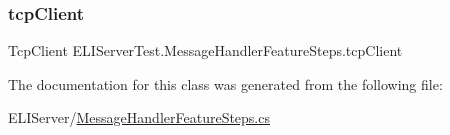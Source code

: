 \subsubsection{\texorpdfstring{tcp\+Client}{tcpClient}}
{\footnotesize\ttfamily Tcp\+Client E\+L\+I\+Server\+Test.\+Message\+Handler\+Feature\+Steps.\+tcp\+Client\hspace{0.3cm}{\ttfamily [private]}}



The documentation for this class was generated from the following file\+:\begin{DoxyCompactItemize}
\item 
E\+L\+I\+Server/\hyperlink{_message_handler_feature_steps_8cs}{Message\+Handler\+Feature\+Steps.\+cs}\end{DoxyCompactItemize}
